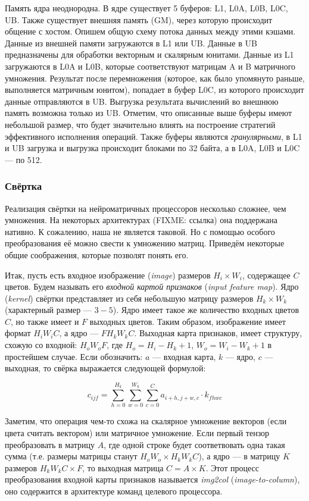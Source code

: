 Память ядра неоднородна. В ядре существует 5 буферов:
L1, L0A, L0B, L0C, UB. Также существует внешняя память (GM), через которую
происходит общение с хостом. Опишем общую схему потока данных между этими кэшами.
Данные из внешней памяти загружаются в L1 или UB. Данные в UB предназначены для
обработки векторным и скалярным юнитами. Данные из L1 загружаются в L0A и L0B,
которые соответствуют матрицам A и B матричного умножения. Результат после
перемножения (которое, как было упомянуто раньше, выполняется матричным юнитом),
попадает в буфер L0C, из которого происходит данные отправляются в UB. Выгрузка
результата вычислений во внешнюю память возможна только из UB. Отметим, что
описанные выше буферы имеют небольшой размер, что будет значительно влиять на
построение стратегий эффективного исполнения операций. Также буферы являются
\textit{гранулярными}, в L1 и UB загрузка и выгрузка происходит блоками по 32
байта, а в L0A, L0B и L0C --- по 512.

\subsubsection{Свёртка}

Реализация свёртки на нейроматричных процессоров несколько сложнее, чем умножения.
На некоторых архитектурах (FIXME: ссылка) она поддержана нативно. К сожалению, наша
не является таковой. Но с помощью особого преобразования её можно свести к 
умножению матриц. Приведём некоторые общие соображения, которые позволят понять его.

Итак, пусть есть входное изображение (\textit{image}) размеров $H_i \times W_i$,
содержащее $C$ цветов. Будем называть его \textit{входной картой признаков}
(\textit{input feature map}). Ядро (\textit{kernel}) свёртки представляет из
себя небольшую матрицу размеров $H_k \times W_k$ (характерный размер --- $3-5$).
Ядро имеет такое же количество входных цветов $C$, но также имеет и $F$
выходных цветов. Таким образом, изображение имеет формат $H_i W_i C$,
а ядро --- $F H_k W_k C$. Выходная карта признаков, имеет структуру, схожую
со входной: $H_o W_o F$, где $H_o = H_i - H_k + 1$, $W_o = W_i - W_k + 1$
в простейшем случае. Если обозначить: $a$ --- входная карта, $k$ --- ядро,
$c$ --- выходная, то свёрка выражается следующей формулой:

\[
    c_{ijf} = \sum \limits_{h = 0}^{H_k} \sum \limits_{w = 0}^{W_k}
              \sum \limits_{c = 0}^{C} a_{i+h, j+w, c} \cdot k_{f h w c}
\]

Заметим, что операция чем-то схожа на скалярное умножение векторов
(если цвета считать вектором) или матричное умножение. Если первый тензор
преобразовать в матрицу $A$, где одной строке будет соответвовать одна
такая сумма (т.е. размеры матрицы станут $H_o W_o \times H_k W_k C$), а
ядро --- в матрицу $K$ размеров $H_k W_k C \times F$, то выходная
матрица $C = A \times K$. Этот процесс преобразования входной карты
признаков называется \textit{img2col} (\textit{image-to-column}),
оно содержится в архитектуре команд целевого процессора.


